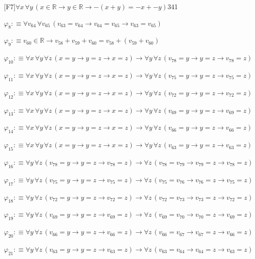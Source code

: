 \begin{fullproof}{[F7]}{$\forall x\,\forall y\,(x \in \mathbb{R} \to y \in \mathbb{R} \to -(x + y) = -x + -y)$}{341}
\begin{abbrevlist}
\item $\varphi_{8} :\equiv \forall v_{64}\,\forall v_{65}\,(v_{63} = v_{64} \to v_{64} = v_{65} \to v_{63} = v_{65})$
\item $\varphi_{9} :\equiv v_{60} \in \mathbb{R} \to v_{58} + v_{59} + v_{60} = v_{58} + (v_{59} + v_{60})$
\item $\varphi_{10} :\equiv \forall x\,\forall y\,\forall z\,(x = y \to y = z \to x = z) \to \forall y\,\forall z\,(v_{78} = y \to y = z \to v_{78} = z)$
\item $\varphi_{11} :\equiv \forall x\,\forall y\,\forall z\,(x = y \to y = z \to x = z) \to \forall y\,\forall z\,(v_{75} = y \to y = z \to v_{75} = z)$
\item $\varphi_{12} :\equiv \forall x\,\forall y\,\forall z\,(x = y \to y = z \to x = z) \to \forall y\,\forall z\,(v_{72} = y \to y = z \to v_{72} = z)$
\item $\varphi_{13} :\equiv \forall x\,\forall y\,\forall z\,(x = y \to y = z \to x = z) \to \forall y\,\forall z\,(v_{69} = y \to y = z \to v_{69} = z)$
\item $\varphi_{14} :\equiv \forall x\,\forall y\,\forall z\,(x = y \to y = z \to x = z) \to \forall y\,\forall z\,(v_{66} = y \to y = z \to v_{66} = z)$
\item $\varphi_{15} :\equiv \forall x\,\forall y\,\forall z\,(x = y \to y = z \to x = z) \to \forall y\,\forall z\,(v_{63} = y \to y = z \to v_{63} = z)$
\item $\varphi_{16} :\equiv \forall y\,\forall z\,(v_{78} = y \to y = z \to v_{78} = z) \to \forall z\,(v_{78} = v_{79} \to v_{79} = z \to v_{78} = z)$
\item $\varphi_{17} :\equiv \forall y\,\forall z\,(v_{75} = y \to y = z \to v_{75} = z) \to \forall z\,(v_{75} = v_{76} \to v_{76} = z \to v_{75} = z)$
\item $\varphi_{18} :\equiv \forall y\,\forall z\,(v_{72} = y \to y = z \to v_{72} = z) \to \forall z\,(v_{72} = v_{73} \to v_{73} = z \to v_{72} = z)$
\item $\varphi_{19} :\equiv \forall y\,\forall z\,(v_{69} = y \to y = z \to v_{69} = z) \to \forall z\,(v_{69} = v_{70} \to v_{70} = z \to v_{69} = z)$
\item $\varphi_{20} :\equiv \forall y\,\forall z\,(v_{66} = y \to y = z \to v_{66} = z) \to \forall z\,(v_{66} = v_{67} \to v_{67} = z \to v_{66} = z)$
\item $\varphi_{21} :\equiv \forall y\,\forall z\,(v_{63} = y \to y = z \to v_{63} = z) \to \forall z\,(v_{63} = v_{64} \to v_{64} = z \to v_{63} = z)$

\end{abbrevlist}
\end{fullproof}
